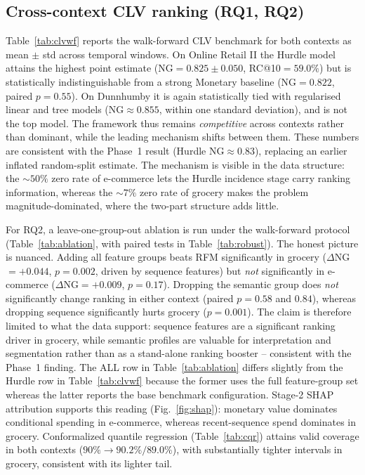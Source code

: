 \documentclass[pdflatex,sn-mathphys-num]{sn-jnl}
\theoremstyle{thmstyleone}
\theoremstyle{thmstylethree}
\begin{document}
\subsection{Cross-context CLV ranking (RQ1, RQ2)}\label{sec:res_clv}
Table~\ref{tab:clvwf} reports the walk-forward CLV benchmark for both contexts as mean $\pm$ std
across temporal windows. On Online Retail II the Hurdle model attains the highest point estimate
(NG$=0.825\pm0.050$, RC@10$=59.0\%$) but is statistically indistinguishable from a strong
Monetary baseline (NG$=0.822$, paired $p=0.55$). On Dunnhumby it is again statistically tied with
regularised linear and tree models (NG$\approx0.855$, within one standard deviation), and is not
the top model. The framework thus remains \emph{competitive} across contexts rather than
dominant, while the leading mechanism shifts between them. These numbers are consistent with the
Phase~1 result (Hurdle NG$\approx0.83$), replacing an earlier inflated random-split estimate. The mechanism is visible in the
data structure: the $\sim50\%$ zero rate of e-commerce lets the Hurdle incidence stage carry
ranking information, whereas the $\sim7\%$ zero rate of grocery makes the problem
magnitude-dominated, where the two-part structure adds little.

For RQ2, a leave-one-group-out ablation is run under the walk-forward protocol
(Table~\ref{tab:ablation}, with paired tests in Table~\ref{tab:robust}). The honest picture is
nuanced. Adding all feature groups beats RFM significantly in grocery ($\Delta$NG$=+0.044$,
$p=0.002$, driven by sequence features) but \emph{not} significantly in e-commerce
($\Delta$NG$=+0.009$, $p=0.17$). Dropping the semantic group does \emph{not} significantly change
ranking in either context (paired $p=0.58$ and $0.84$), whereas dropping sequence significantly
hurts grocery ($p=0.001$). The claim is therefore limited to what the data support: sequence features are a
significant ranking driver in grocery, while semantic profiles are valuable for interpretation and
segmentation rather than as a stand-alone ranking booster -- consistent with the Phase~1 finding. The ALL row in Table~\ref{tab:ablation} differs slightly from the Hurdle row in Table~\ref{tab:clvwf} because the former uses the full feature-group set whereas the latter reports the base benchmark configuration.
Stage-2 SHAP attribution supports this reading (Fig.~\ref{fig:shap}): monetary value dominates
conditional spending in e-commerce, whereas recent-sequence spend dominates in grocery. Conformalized quantile regression
(Table~\ref{tab:cqr}) attains valid coverage in both contexts ($90\%\!\to\!90.2\%/89.0\%$), with
substantially tighter intervals in grocery, consistent with its lighter tail.
\end{document}
